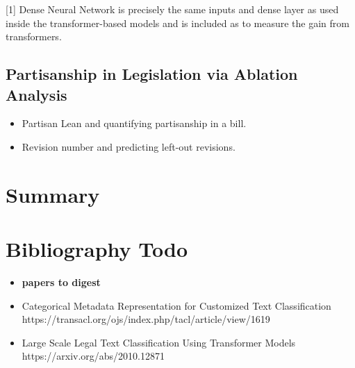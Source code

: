 \documentclass[11pt]{article}
\begin{document}
\vspace{3mm}

[1] Dense Neural Network is precisely the same inputs and dense layer as used inside the transformer-based models and is 
included as to measure the gain from transformers. 

\subsection{Partisanship in Legislation via Ablation Analysis}

\begin{itemize}
  \item Partisan Lean and quantifying partisanship in a bill.
  \item Revision number and predicting left-out revisions.
\end{itemize}

\section{Summary}




\section{Bibliography Todo}

\begin{itemize}
  \item \textbf{papers to digest}
  \item Categorical Metadata Representation for Customized Text Classification  https://transacl.org/ojs/index.php/tacl/article/view/1619
  \item Large Scale Legal Text Classification Using Transformer Models  https://arxiv.org/abs/2010.12871
\end{itemize}







\end{document}
